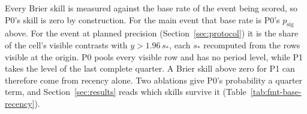 \documentclass[sigconf,nonacm]{acmart}
\newcommand{\psig}{p_{\mathrm{sig}}}
\begin{document}
Every Brier skill is measured against the base rate of the event being scored, so P0's skill is zero by construction. For the main event that base rate is P0's $\psig$ above. For the event at planned precision (Section~\ref{sec:protocol}) it is the share of the cell's visible contrasts with $y > 1.96\,s_\ast$, each $s_\ast$ recomputed from the rows visible at the origin. P0 pools every visible row and has no period level, while P1 takes the level of the last complete quarter. A Brier skill above zero for P1 can therefore come from recency alone. Two ablations give P0's probability a quarter term, and Section~\ref{sec:results} reads which skills survive it (Table~\ref{tab:fmt-base-recency}).
\end{document}
